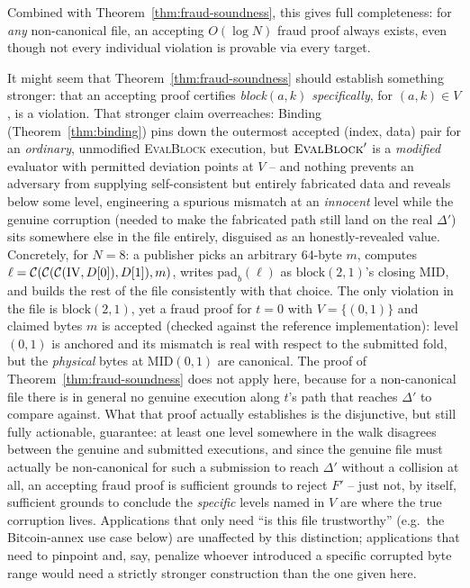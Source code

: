 Combined with Theorem~\ref{thm:fraud-soundness}, this gives full
completeness: for \emph{any} non-canonical file, an accepting $O(\log N)$
fraud proof always exists, even though not every individual violation is
provable via every target.

\begin{remark}
\label{rem:fraud-localization}
It might seem that Theorem~\ref{thm:fraud-soundness} should establish
something stronger: that an accepting proof certifies \emph{block$(a,k)$
specifically}, for $(a,k) \in V$, is a violation. That stronger claim
overreaches: Binding (Theorem~\ref{thm:binding}) pins down the
outermost accepted (index, data) pair for an \emph{ordinary}, unmodified
\textsc{EvalBlock} execution, but $\textsc{EvalBlock}'$ is a
\emph{modified} evaluator with permitted deviation points at $V$ -- and
nothing prevents an adversary from supplying self-consistent but entirely
fabricated data and reveals below some level, engineering a spurious
mismatch at an \emph{innocent} level while the genuine corruption (needed
to make the fabricated path still land on the real $\Delta'$) sits
somewhere else in the file entirely, disguised as an honestly-revealed
value. Concretely, for $N=8$: a publisher picks an arbitrary 64-byte $m$,
computes $\ell = \mathcal{C}(\mathcal{C}(\mathcal{C}(\mathrm{IV}, D[0]), D[1]), m)$, writes
$\mathrm{pad}_b(\ell)$ as $\mathrm{block}(2,1)$'s closing $\mathrm{MID}$,
and builds the rest of the file consistently with that choice. The only
violation in the file is $\mathrm{block}(2,1)$, yet a fraud proof for
$t=0$ with $V = \{(0,1)\}$ and claimed bytes $m$ is accepted (checked
against the reference implementation): level $(0,1)$ is anchored and its
mismatch is real with respect to the submitted fold, but the
\emph{physical} bytes at $\mathrm{MID}(0,1)$ are canonical. The proof of
Theorem~\ref{thm:fraud-soundness} does not apply here, because for a
non-canonical file there is in general no genuine execution along $t$'s
path that reaches $\Delta'$ to compare against. What that proof actually
establishes is the disjunctive, but still fully actionable, guarantee: at
least one level somewhere in the walk disagrees between the genuine and
submitted executions, and since the genuine file must actually be
non-canonical for such a submission to reach $\Delta'$ without a collision
at all, an accepting fraud proof is sufficient grounds to reject $F'$ --
just not, by itself, sufficient grounds to conclude the \emph{specific}
levels named in $V$ are where the true corruption lives. Applications that
only need ``is this file trustworthy'' (e.g.\ the Bitcoin-annex use case
below) are unaffected by this distinction; applications that need to
pinpoint and, say, penalize whoever introduced a specific corrupted byte
range would need a strictly stronger construction than the one given here.
\end{remark}

